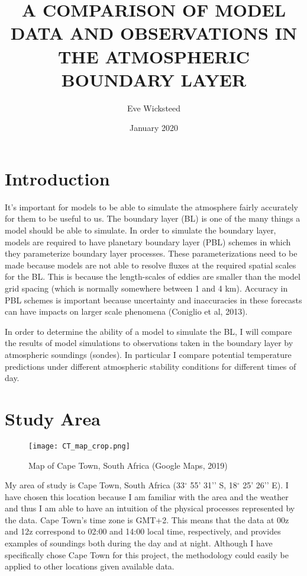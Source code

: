 \documentclass[12pt]{article}
\title{A COMPARISON OF MODEL DATA AND OBSERVATIONS IN THE ATMOSPHERIC BOUNDARY LAYER}
\author{Eve Wicksteed}
\date{January 2020}
\begin{document}
\maketitle

\section{Introduction}


It’s important for models to be able to simulate the atmosphere fairly accurately for them to 
be useful to us. The boundary layer (BL) is one of the many things a model should be able to 
simulate. In order to simulate the boundary layer, models are required to have planetary boundary 
layer (PBL) schemes in which they parameterize boundary layer processes.  These parameterizations 
need to be made because models are not able to resolve fluxes at the required spatial scales 
for the BL.  This is because the length-scales of eddies are smaller than the model grid spacing 
(which is normally somewhere between 1 and 4 km). Accuracy in PBL schemes is important because 
uncertainty and inaccuracies in these forecasts can have impacts on larger scale phenomena 
(Coniglio et al, 2013).

In order to determine the ability of a model to simulate the BL, I will compare the results of 
model simulations to observations taken in the boundary layer by atmospheric soundings (sondes). 
In particular I compare potential temperature predictions under different atmospheric stability 
conditions for different times of day. 


\section{Study Area}


\begin{figure}[h]
    \centering
    \texttt{[image: CT\_map\_crop.png]}
    \caption{Map of Cape Town, South Africa (Google Maps, 2019)}
    \label{fig:map}
\end{figure}

My area of study is Cape Town, South Africa (33$^{\circ}$ 55’ 31’’ S, 18$^{\circ}$ 25’ 26’’ E). I have chosen 
this location because I am familiar with the area and the weather and thus I am able to have 
an intuition of the physical processes represented by the data. Cape Town’s time zone is GMT+2. 
This means that the data at 00z and 12z correspond to 02:00 and 14:00 local time, respectively, 
and provides examples of soundings both during the day and at night. Although I have specifically 
chose Cape Town for this project, the methodology could easily be applied to other locations 
given available data.
\end{document}

